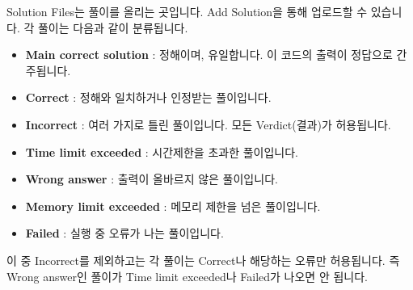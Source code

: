 \documentclass{article}
\begin{document}
    Solution Files는 풀이를 올리는 곳입니다. Add Solution을 통해 업로드할 수 있습니다. 각 풀이는 다음과 같이 분류됩니다.
    \begin{itemize}
        \item \textbf{Main correct solution} : 정해이며, 유일합니다. 이 코드의 출력이 정답으로 간주됩니다.
        \item \textbf{Correct} : 정해와 일치하거나 인정받는 풀이입니다.
        \item \textbf{Incorrect} : 여러 가지로 틀린 풀이입니다. 모든 Verdict(결과)가 허용됩니다.
        \item \textbf{Time limit exceeded} : 시간제한을 초과한 풀이입니다.
        \item \textbf{Wrong answer} : 출력이 올바르지 않은 풀이입니다.
        \item \textbf{Memory limit exceeded} : 메모리 제한을 넘은 풀이입니다.
        \item \textbf{Failed} : 실행 중 오류가 나는 풀이입니다.
    \end{itemize}
    이 중 Incorrect를 제외하고는 각 풀이는 Correct나 해당하는 오류만 허용됩니다. 즉 Wrong answer인 풀이가 Time limit exceeded나 Failed가 나오면 안 됩니다.
\end{document}
